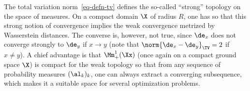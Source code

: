 \begin{rem}
		The total variation norm~\eqref{eq-defn-tv} defines the so-called ``strong'' topology on the space of measures.
	On a compact domain $\X$ of radius $R$, one has
	so that this strong notion of convergence implies the weak convergence metrized by Wasserstein distances.
	The converse is, however, not true, since $\de_x$ does not converge strongly to $\de_y$ if $x \rightarrow y$ (note that
	$\norm{\de_x-\de_y}_{\TV}=2$ if $x \neq y$).
	A chief advantage is that $\Mm_+^1(\Xx)$ (once again on a compact ground space $\X$) is compact for the weak topology so that from any sequence of probability measures $(\al_k)_k$, one can always extract a converging subsequence, which makes it a suitable space for several optimization problems. %
\end{rem}

